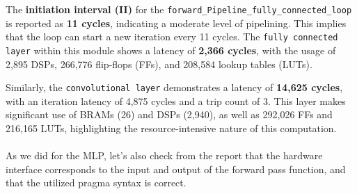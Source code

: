 \documentclass{article}
\begin{document}
The \textbf{initiation interval (II)} for the \texttt{forward\_Pipeline\_fully\_connected\_loop} is reported as \textbf{11 cycles}, indicating a moderate level of pipelining. This implies that the loop can start a new iteration every 11 cycles. The \texttt{fully connected layer} within this module shows a latency of \textbf{2,366 cycles}, with the usage of 2,895 DSPs, 266,776 flip-flops (FFs), and 208,584 lookup tables (LUTs).

Similarly, the \texttt{convolutional layer} demonstrates a latency of \textbf{14,625 cycles}, with an iteration latency of 4,875 cycles and a trip count of 3. This layer makes significant use of BRAMs (26) and DSPs (2,940), as well as 292,026 FFs and 216,165 LUTs, highlighting the resource-intensive nature of this computation.
\\\\As we did for the MLP, let's also check from the report that the hardware interface corresponds to the input and output of the forward pass function, and that the utilized pragma syntax is correct.
\end{document}
